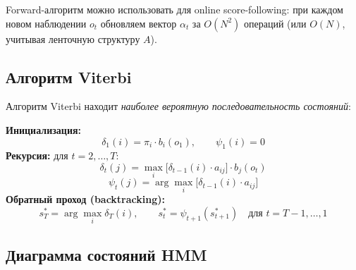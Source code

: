 \documentclass[a4paper,11pt]{article}
\begin{document}
Forward-алгоритм можно использовать для online score-following:
при каждом новом наблюдении $o_t$ обновляем вектор $\alpha_t$
за $O(N^2)$ операций (или $O(N)$, учитывая ленточную структуру $A$).

\subsection{Алгоритм Viterbi}

Алгоритм Viterbi находит \emph{наиболее вероятную последовательность состояний}:

\begin{formulabox}[title={Алгоритм Viterbi}]
\textbf{Инициализация:}
\[
  \delta_1(i) = \pi_i \cdot b_i(o_1), \qquad \psi_1(i) = 0
\]
\textbf{Рекурсия:} для $t = 2, \ldots, T$:
\[
  \delta_t(j) = \max_{i} \bigl[\delta_{t-1}(i) \cdot a_{ij}\bigr] \cdot b_j(o_t)
\]
\[
  \psi_t(j) = \arg\max_{i} \bigl[\delta_{t-1}(i) \cdot a_{ij}\bigr]
\]
\textbf{Обратный проход (backtracking):}
\[
  s_T^* = \arg\max_{i} \delta_T(i), \qquad s_t^* = \psi_{t+1}(s_{t+1}^*) \quad \text{для } t = T{-}1, \ldots, 1
\]
\end{formulabox}

\subsection{Диаграмма состояний HMM}
\end{document}
